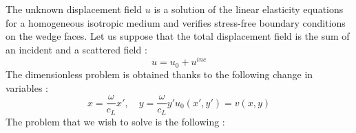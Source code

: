 The unknown displacement field $u$ is a solution of the linear elasticity equations for a homogeneous isotropic medium and verifies stress-free boundary conditions on the wedge faces. Let us suppose that the total displacement field is the sum of an incident and a scattered field :
\begin{equation}
u=u_0+u^{inc}
\end{equation}
The dimensionless problem is obtained thanks to the following change in variables :
\begin{subequations}
\begin{equation}
x=\frac{\omega}{c_L} x', \hspace{1em} y=\frac{\omega}{c_L} y'
\end{equation}
\begin{equation}
u_0(x',y')=v(x,y)
\end{equation}
\label{adim}
\end{subequations}
The problem that we wish to solve is the following :

